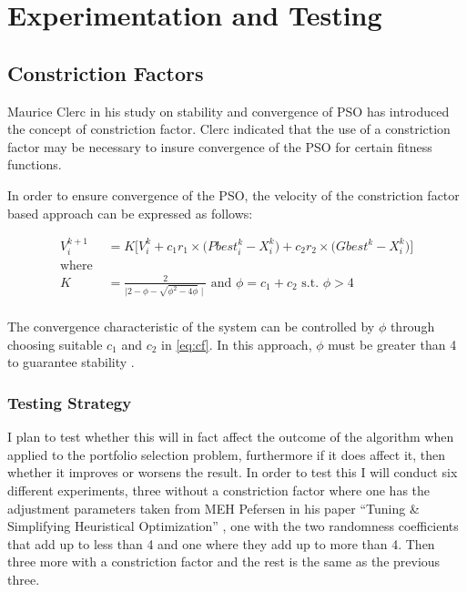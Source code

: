 \documentclass{pdfmx4020}
\begin{document}


\chapter{Experimentation and Testing}

  \section{Constriction Factors} %
  \label{sec:constriction_factors}
    Maurice Clerc in his study on stability and convergence of PSO \cite{constriction_factor} has introduced the concept of constriction factor. Clerc indicated that the use of a constriction factor may be necessary to insure convergence of the PSO for certain fitness functions.

    In order to ensure convergence of the PSO, the velocity of the constriction factor based approach can be expressed as follows:

    \begin{equation} \label{eq:cf}
      \begin{split}
        V_{i}^{k+1} & = K \Bigg[ V_{i}^{k} + c_1 r_1 \times \Big( Pbest_{i}^{k} - X_{i}^{k} \Big) + c_2 r_2 \times \Big( Gbest^{k} - X_{i}^{k} \Big) \Bigg] \\
        \text{where }\\
        K & = \frac{2}{\mid 2 - \phi - \sqrt{\phi^2 -4\phi} \mid} \text{ and } \phi = c_1 + c_2 \text{ s.t. } \phi > 4  \\
      \end{split}
    \end{equation}

    The convergence characteristic of the system can be controlled by $\phi$ through choosing suitable $c_1$ and $c_2$ in \eqref{eq:cf}. In this approach, $\phi$ must be greater than 4 to guarantee stability \cite{constriction_factor_2}.

    \subsection{Testing Strategy} %
    \label{sub:testing_strategy}
      I plan to test whether this will in fact affect the outcome of the algorithm when applied to the portfolio selection problem, furthermore if it does affect it, then whether it improves or worsens the result. In order to test this I will conduct six different experiments, three without a constriction factor where one has the adjustment parameters taken from MEH Pefersen in his paper ``Tuning \& Simplifying Heuristical Optimization'' \cite{constriction_factor_3}, one with the two randomness coefficients that add up to less than 4 and one where they add up to more than 4. Then three more with a constriction factor and the rest is the same as the previous three. 
\end{document}

